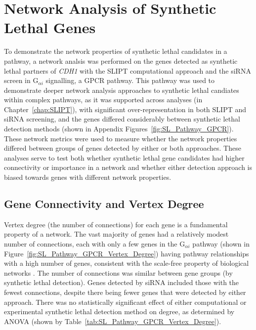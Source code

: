\FloatBarrier

\section{Network Analysis of Synthetic Lethal Genes}   \label{chapt4:Network_Test}


To demonstrate the network properties of \gls{synthetic lethal} candidates in a pathway, a network analsis was performed on the genes detected as \gls{synthetic lethal} partners of \textit{CDH1} with the \gls{SLIPT} computational approach and the \gls{siRNA} screen \citep{Telford2015} %
in %
G$_{\alpha i}$ signalling, a \gls{GPCR} \gls{pathway}. This \gls{pathway} was used to demonstrate deeper network analysis approaches to \gls{synthetic lethal} candiates within complex \glspl{pathway}, as it was supported across analyses (in Chapter~\ref{chap:SLIPT}), with significant over-representation in both \gls{SLIPT} and \gls{siRNA} screening, and the genes differed considerably between \gls{synthetic lethal} detection methods (shown in Appendix Figures~\ref{fig:SL_Pathway_GPCR}).  These network metrics were used to measure whether the network properties differed between groups of genes detected by either or both approaches. These analyses serve to test both whether \gls{synthetic lethal} gene candidates had higher connectivity or importance in a network and whether either detection approach is biased towards genes with different network properties.  


\FloatBarrier


\subsection{Gene Connectivity and Vertex Degree}  \label{chapt4:Network_Vertex_Degree}

Vertex degree (the number of connections) for each gene is a fundamental property of a network. The vast majority of genes had a relatively modest number of connections, each with only a few genes in the G$_{\alpha i}$ \gls{pathway} (shown in Figure~\ref{fig:SL_Pathway_GPCR_Vertex_Degree}) having \gls{pathway} relationships with a high number of genes, consistent with the \gls{scale-free} property of biological networks \citep{Barabasi2004}. The number of connections was similar between gene groups (by \gls{synthetic lethal} detection). Genes detected by \gls{siRNA} included those with the fewest connections, despite there being fewer genes that were detected by either approach. 
There was no statistically significant effect of either computational or experimental \gls{synthetic lethal} detection method on  degree, as determined by \gls{ANOVA} (shown by Table~\ref{tab:SL_Pathway_GPCR_Vertex_Degree}).

